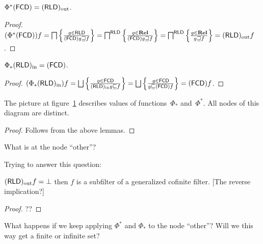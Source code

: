 \begin{lem}
  $\Phi^{\ast}  (\mathsf{FCD}) = (\mathsf{RLD})_{\mathrm{out}}$.
\end{lem}

\begin{proof}
  $(\Phi^{\ast}  (\mathsf{FCD})) f = \bigsqcap \left\{ \frac{ g \in
  \mathsf{RLD} }{ (\mathsf{FCD}) g
  \sqsupseteq f }\right\} = \bigsqcap^{\mathsf{RLD}} \left\{ \frac{ g \in \mathbf{Rel}
  }{ (\mathsf{FCD}) g \sqsupseteq f }\right\} =
  \bigsqcap^{\mathsf{RLD}} \left\{ \frac{ g \in \mathbf{Rel} }{ g
  \sqsupseteq f }\right\} = (\mathsf{RLD})_{\mathrm{out}} f$.
\end{proof}

\begin{lem}
  $\Phi_{\ast} (\mathsf{RLD})_{\mathrm{in}} = (\mathsf{FCD})$.
\end{lem}

\begin{proof}
  $(\Phi_{\ast} \torldin) f = \bigsqcup \setcond{ g
  \in \mathsf{FCD} }{
 \torldin g \sqsubseteq f } = \bigsqcup
  \setcond{ g \in \mathsf{FCD} }{ g \sqsubseteq
  \tofcd f } = \tofcd f$.
\end{proof}

\begin{thm}
The picture at figure~\ref{dia:fcd-rld-gal} describes values of functions~$\Phi_{\ast}$ and~$\Phi^{\ast}$.
All nodes of this diagram are distinct.
\begin{figure}
  \caption{\label{dia:fcd-rld-gal}}
\end{figure}
\end{thm}

\begin{proof}
Follows from the above lemmas.
\end{proof}

\begin{question}
What is at the node ``other''?
\end{question}

Trying to answer this question:

\begin{lem}
$(\mathsf{RLD})_{\mathrm{out}} f=\bot$ then $f$ is a subfilter of a
generalized cofinite filter.
[The reverse implication?]
\end{lem}

\begin{proof}
??
\end{proof}

\begin{question}
What happens if we keep applying $\Phi^{\ast}$ and $\Phi_{\ast}$ to the node ``other''?
Will we this way get a finite or infinite set?
\end{question}
